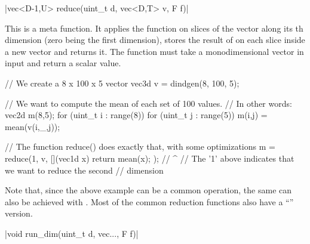 \funcitem \cppinline|vec<D-1,U> reduce(uint_t d, vec<D,T> v, F f)| 

This is a meta function. It applies the function  on slices of the vector  along its th dimension (zero being the first dimension), stores the result of  on each slice inside a new vector and returns it. The function  must take a monodimensional vector in input and return a scalar value.

\begin{example}
\begin{cppcode}
// We create a 8 x 100 x 5 vector
vec3d v = dindgen(8, 100, 5);

// We want to compute the mean of each set of 100 values.
// In other words:
vec2d m(8,5);
for (uint_t i : range(8))
for (uint_t j : range(5)) {
    m(i,j) = mean(v(i,_,j));
}

// The function reduce() does exactly that, with some optimizations
m = reduce(1, v, [](vec1d x) { return mean(x); });
//         ^
// The '1' above indicates that we want to reduce the second
// dimension
\end{cppcode}
\end{example}

Note that, since the above example can be a common operation, the same can also be achieved with . Most of the common reduction functions also have a ``'' version.

\funcitem \cppinline|void run_dim(uint_t d, vec..., F f)| 

